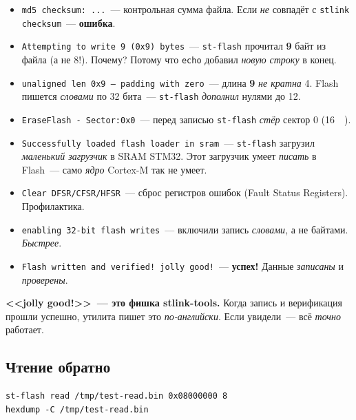\begin{itemize}
    \item \texttt{md5 checksum: ...}~--- контрольная сумма
          файла. Если \emph{не} совпадёт с \texttt{stlink
          checksum}~--- \textbf{ошибка}.
    \item \texttt{Attempting to write 9 (0x9) bytes}~---
          \texttt{st-flash} прочитал \textbf{9} байт из
          файла (а не 8!). Почему? Потому что \texttt{echo}
          добавил \emph{новую строку} в конец.
    \item \texttt{unaligned len 0x9 -- padding with zero}~---
          длина \textbf{9} \emph{не кратна} 4. Flash
          пишется \emph{словами} по 32 бита~---
          \texttt{st-flash} \emph{дополнил} нулями до 12.
    \item \texttt{EraseFlash - Sector:0x0}~--- перед
          записью \texttt{st-flash} \emph{стёр} сектор 0
          (\SI{16}{\kilo\byte}).
    \item \texttt{Successfully loaded flash loader in sram}~---
          \texttt{st-flash} загрузил \emph{маленький
          загрузчик} в SRAM STM32. Этот загрузчик умеет
          \emph{писать} в Flash~--- само \emph{ядро} Cortex-M
          так не умеет.
    \item \texttt{Clear DFSR/CFSR/HFSR}~--- сброс регистров
          ошибок (Fault Status Registers). Профилактика.
    \item \texttt{enabling 32-bit flash writes}~--- включили
          запись \emph{словами}, а не байтами. \emph{Быстрее}.
    \item \texttt{Flash written and verified! jolly good!}~---
          \textbf{успех!} Данные \emph{записаны} и
          \emph{проверены}.
\end{itemize}

\begin{keybox}
\textbf{<<jolly good!>>~--- это фишка stlink-tools.}
Когда запись и верификация прошли успешно, утилита
пишет это \emph{по-английски}. Если увидели~---
всё \emph{точно} работает.
\end{keybox}

\subsection{Чтение обратно}

\begin{verbatim}
st-flash read /tmp/test-read.bin 0x08000000 8
hexdump -C /tmp/test-read.bin
\end{verbatim}

